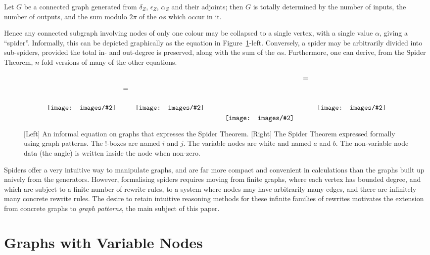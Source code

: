 \documentclass[runningheads]{llncs}
\newcommand{\inlinegraphic}[2]{
  \dimendef\grafheight=255\dimendef\grafvshift=254
  \grafheight=#1
  \grafvshift=-0.5\grafheight
  \advance\grafvshift by 0.5ex
  \raisebox{\grafvshift}{\texttt{[image: images/\#2]}\xspace}
}
\begin{document}
\begin{theorem}
  Let $G$ be a connected graph generated
  from $\delta_Z$, $\epsilon_Z$, $\alpha_Z$ and their adjoints; then
  $G$ is totally determined by the number of inputs, the number of
  outputs, and the sum modulo $2\pi$ of the $\alpha$s which occur in
  it.
\end{theorem}

\noindent Hence any connected subgraph involving nodes of only one colour may be
collapsed to a single vertex, with a single value $\alpha$, giving a
``spider''. Informally, this can be depicted graphically as the
equation in Figure~\ref{fig:spider}-left. Conversely, a spider may be
arbitrarily divided into sub-spiders, provided the total in- and
out-degree is preserved, along with the sum of the $\alpha$s.
Furthermore, one can derive, from the Spider Theorem, $n$-fold versions of
many of the other equations.

\begin{figure}[t]
$$\begin{array}{ccc}
\inlinegraphic{6em}{spider_lhs} & = & \inlinegraphic{6em}{spider_rhs}
\end{array}\qquad
\begin{array}{ccc}
\inlinegraphic{12em}{spider_lhs_patt} & \;=\; & \inlinegraphic{9em}{spider_rhs_patt}
\end{array}$$
\label{fig:spider}\caption{ [Left] An informal equation on graphs that
  expresses the Spider Theorem.  [Right] The Spider Theorem expressed
  formally using graph patterns.  The !-boxes are named $i$ and $j$.
  The variable nodes are white and named $a$ and $b$. The non-variable
  node data (the angle) is written inside the node when non-zero.}
\end{figure}

Spiders offer a very intuitive way to manipulate graphs, and are far
more compact and convenient in calculations than the graphs built up
naively from the generators.  However, formalising spiders requires
moving from finite graphs, where each vertex has bounded degree, and
which are subject to a finite number of rewrite rules, to a system
where nodes may have arbitrarily many edges, and there are infinitely
many concrete rewrite rules. The desire to retain intuitive reasoning
methods for these infinite families of rewrites motivates the
extension from concrete graphs to \emph{graph patterns}, the main
subject of this paper.

\section{Graphs with Variable Nodes}
\end{document}
